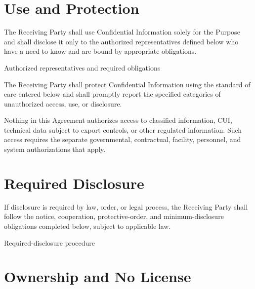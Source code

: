 \documentclass{linearspace-legal}
\begin{document}
\begin{LSForm}
\section{Use and Protection}

\begin{legalclauses}
  \item The Receiving Party shall use Confidential Information solely for the
  Purpose and shall disclose it only to the authorized representatives defined
  below who have a need to know and are bound by appropriate obligations.

    {Authorized representatives and required obligations}

  \item The Receiving Party shall protect Confidential Information using the
  standard of care entered below and shall promptly report the specified
  categories of unauthorized access, use, or disclosure.


  \item Nothing in this Agreement authorizes access to classified information,
  CUI, technical data subject to export controls, or other regulated
  information. Such access requires the separate governmental, contractual,
  facility, personnel, and system authorizations that apply.
\end{legalclauses}

\section{Required Disclosure}

\begin{legalclauses}
  \item If disclosure is required by law, order, or legal process, the Receiving
  Party shall follow the notice, cooperation, protective-order, and
  minimum-disclosure obligations completed below, subject to applicable law.

    {Required-disclosure procedure}
\end{legalclauses}

\section{Ownership and No License}


\end{LSForm}
\end{document}
